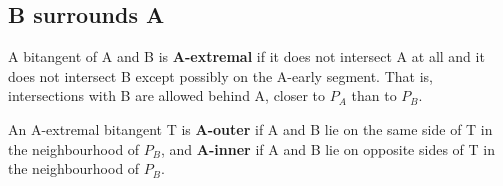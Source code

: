 \documentclass[12pt]{article}
\newif\ifCommentary             %
\begin{document}
\clearpage

\subsection{B surrounds A}
\label{sec:BsurroundA}

\ifCommentary
If B surrounds A, the definition of outer bitangent must be generalized,
since every bitangent will necessarily intersect B.
The appropriate generalization is to allow intersections on the 'other' side of A.
\fi

\begin{defn2}
A bitangent of A and B is {\bf A-extremal} if 
it does not intersect A at all and
it does not intersect B except possibly on the A-early segment.
That is, intersections with B are allowed behind A, closer to $P_A$ than to $P_B$.
\end{defn2}






\begin{defn2}
An A-extremal bitangent T is {\bf A-outer} if A and B lie on the same side of T 
in the neighbourhood of $P_B$,
and {\bf A-inner} if A and B lie on opposite sides of T in the neighbourhood of $P_B$.
\end{defn2}
\end{document}
